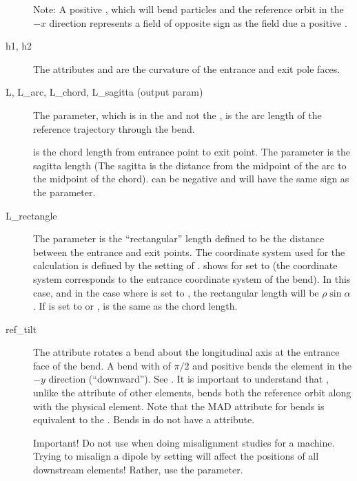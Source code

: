 \begin{description}
Note: A positive , which will bend particles and the reference orbit in the $-x$ direction
represents a field of opposite sign as the field due a positive .
  \item[h1, h2] \Newline
The attributes  and  are the curvature of the entrance and exit pole faces.
  \item[L, L_arc, L_chord, L_sagitta (output param)]  \Newline
The  parameter, which is in the  and not the , 
is the arc length of the reference trajectory through the bend.

 is the chord length from entrance point to exit point.
The  parameter is the sagitta length (The sagitta is the distance
from the midpoint of the arc to the midpoint of the chord).  can be negative and will have
the same sign as the  parameter.
  \item[L_rectangle] \Newline
The  parameter is the ``rectangular'' length defined to be the distance between the
entrance and exit points. The coordinate system used for the calculation is defined by the setting
of .  shows  for  set to
 (the coordinate system corresponds to the entrance coordinate system of the bend).
In this case, and in the case where  is set to , the rectangular
length will be $\rho \sin\alpha$. If  is set to  or ,
 is the same as the chord length.
  \item[ref_tilt] \Newline
The  attribute rotates a bend about the longitudinal axis at the entrance face of the
bend. A bend with  of $\pi/2$ and positive  bends the element in the $-y$
direction (``downward''). See . It is important to understand that ,
unlike the  attribute of other elements, bends both the reference orbit along with the
physical element. Note that the MAD  attribute for bends is equivalent to the \bmad
{}. Bends in \bmad do not have a  attribute.

Important! Do not use  when doing misalignment studies for a machine. Trying to misalign
a dipole by setting  will affect the positions of all downstream elements! Rather, use the
 parameter.
  \end{description}

